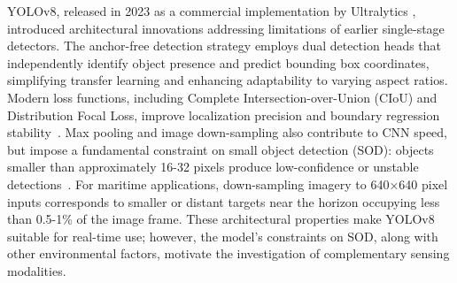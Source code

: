 \documentclass{erauthesis}
\begin{document}
YOLOv8, released in 2023 as a commercial implementation by Ultralytics \cite{ultralytics}, introduced architectural innovations addressing limitations of earlier single-stage detectors.
The anchor-free detection strategy employs dual detection heads that independently identify object presence and predict bounding box coordinates, simplifying transfer learning and enhancing adaptability to varying aspect ratios.
Modern loss functions, including Complete Intersection-over-Union (CIoU) and Distribution Focal Loss, improve localization precision and boundary regression stability~\cite{redmon2016}.
Max pooling and image down-sampling also contribute to CNN speed, but 
impose a fundamental constraint on small object detection (SOD): objects smaller than approximately 16-32 pixels produce low-confidence or unstable detections~\cite{rekavandi2022}.
For maritime applications, down-sampling imagery to 640×640 pixel inputs corresponds to smaller or distant targets near the horizon occupying less than 0.5-1\% of the image frame.
These architectural properties make YOLOv8 suitable for real-time use; however, the model's constraints on SOD, along with other environmental factors, motivate the investigation of complementary sensing modalities.



\end{document}
